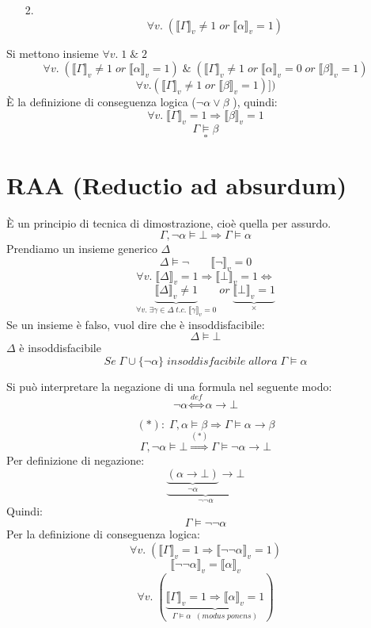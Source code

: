 \documentclass{article}
\theoremstyle{break}
\theoremstyle{break}
\theoremstyle{break}
\theoremstyle{break}
\begin{document}
\begin{exercise}
\begin{enumerate}
\[      \]
    \item[2.]
      \[
        \forall v.\; (\llbracket \Gamma\rrbracket_v \neq 1\; or\; \llbracket \alpha\rrbracket_v=1)  
      \] 
  \end{enumerate}
  Si mettono insieme \(\forall v.\; 1\; \&\; 2 \) 
  \[
    \forall v.\; (\llbracket \Gamma\rrbracket_v \neq 1\; or\; \llbracket \alpha\rrbracket_v=1)\; \&\; (\llbracket \Gamma\rrbracket_v \neq 1\; or\; \llbracket \alpha\rrbracket_v=0\; or\; \llbracket \beta\rrbracket_v=1)
  \] 
  \[
    \forall v.(\llbracket \Gamma\rrbracket_v \neq 1\; or\; \llbracket \beta\rrbracket_v=1)])
  \]
  È la definizione di conseguenza logica (\( \neg \alpha \vee \beta \) ), quindi:
  \[
    \forall v. \;\llbracket \Gamma\rrbracket_v=1 \Rightarrow \llbracket \beta\rrbracket_v=1
  \] 
  \[
    \Gamma \models \beta
  \] 
  \[
    \square
  \]  
\end{exercise}



\section{RAA (Reductio ad absurdum)}
È un principio di tecnica di dimostrazione, cioè quella per assurdo.
\[
  \Gamma, \neg \alpha \models \bot \Rightarrow \Gamma \models \alpha
\] 
Prendiamo un insieme generico \( \Delta \) 
\[
  \Delta \models \neg \;\;\;\;\;\;\; \llbracket \neg\rrbracket_v=0
\] 
\[
  \forall v.\; \llbracket \Delta\rrbracket_v=1 \Rightarrow \llbracket \bot\rrbracket_v=1 \Leftrightarrow
\] 
\[
  \underbrace{\llbracket \Delta\rrbracket_v \neq 1}_{\forall v.\; \exists \gamma \in \Delta\; t.c.\; \llbracket \gamma\rrbracket_v=0}\; or\; \underbrace{\llbracket \bot\rrbracket_v=1}_{ \times }
\] 
Se un insieme è falso, vuol dire che è insoddisfacibile:
\[
  \Delta \models \bot
\] 
\( \Delta \) è insoddisfacibile
\[
  Se\; \Gamma \cup \{ \neg \alpha \}\; insoddisfacibile\; allora\; \Gamma \models \alpha
\] 
\begin{definition}
  Si può interpretare la negazione di una formula nel seguente modo:
  \[
    \neg \alpha \stackrel{def}{\Leftrightarrow} \alpha \to \bot
  \] 
\end{definition}

\[
  (*):\; \Gamma, \alpha \models \beta \Rightarrow \Gamma \models \alpha \to \beta
\] 
\[
  \Gamma, \neg \alpha \models \bot \stackrel{(*)}{\Rightarrow} \Gamma \models \neg \alpha \to \bot
\] 
Per definizione di negazione:
\[
  \underbrace{ \underbrace{(\alpha \to \bot)}_{\neg \alpha} \to \bot}_{\neg \neg \alpha}
\] 
Quindi:
\[
  \Gamma \models \neg \neg \alpha
\] 
Per la definizione di conseguenza logica:
\[
  \forall v.\; (\llbracket \Gamma\rrbracket_v=1 \Rightarrow \llbracket \neg \neg \alpha\rrbracket_v=1)
\] 
\[
  \llbracket \neg \neg \alpha\rrbracket_v=\llbracket \alpha\rrbracket_v
\] 
\[
  \forall v.\; (\underbrace{\llbracket \Gamma\rrbracket_v=1 \Rightarrow \llbracket \alpha\rrbracket_v=1}_{\Gamma \models \alpha\;\;(modus\;ponens)})
\] 
\end{document}
